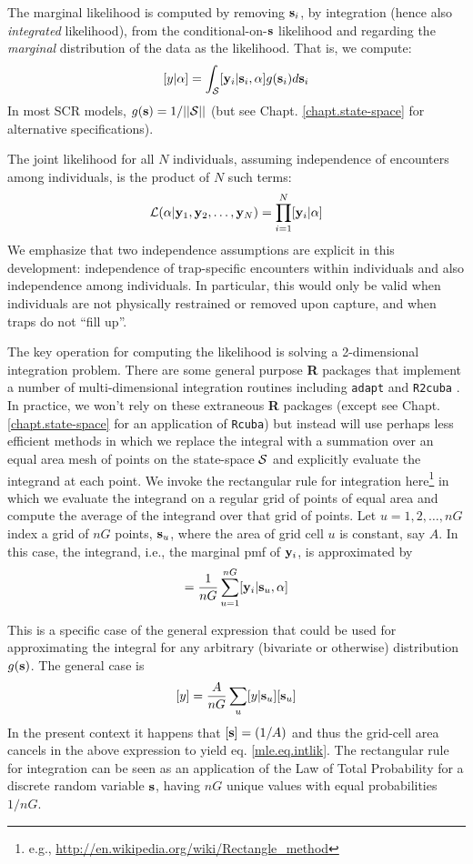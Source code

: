 The marginal likelihood is computed by removing
${\bf s}_{i}$, by integration (hence also {\it integrated} likelihood), from the conditional-on-${\bf s}$
likelihood and regarding the {\it marginal} distribution of the data
as 
the likelihood. That
is, we compute:
\[
  [y|\alpha] = 
\int_{{\cal S}}  [ {\bf y}_{i} |{\bf s}_{i}, \alpha] g({\bf s}_{i}) d{\bf s}_{i}
\]
In most SCR models, $g({\bf s}) = 1/||{\cal S}||$ (but see Chapt. \ref{chapt.state-space} for
alternative specifications).

The joint likelihood for all $N$ individuals, assuming independence of
encounters among individuals, is the product of $N$ such terms:
\[
{\cal L}(\alpha | {\bf y}_{1},{\bf y}_{2},\ldots, {\bf y}_{N}) =     \prod_{i=1}^{N}
[{\bf y}_{i}|\alpha]
\]
We emphasize that two independence assumptions are explicit in this
development: independence of trap-specific encounters within
individuals and also independence among individuals. In particular,
this would only be valid when individuals are not physically
restrained or removed upon capture, and when traps do not ``fill up''.

The key operation for computing the likelihood is solving a
2-dimensional integration problem. There are some general purpose {\bf
  R} packages that implement a number of 
 multi-dimensional integration routines
including \mbox{\tt adapt} \citep{genz_etal:2007} and \mbox{\tt R2cuba}
\citep{hahn_etal:2011}.  In practice, we won't rely
on these extraneous {\bf R} packages (except see
Chapt. \ref{chapt.state-space} for an application of \mbox{\tt Rcuba})
but instead will use perhaps less
efficient methods in which we replace the integral with a summation
over an equal area mesh of points on the state-space ${\cal S}$ and explicitly
evaluate the integrand at each point. We invoke the rectangular rule
for integration here\footnote{e.g., 
\url{http://en.wikipedia.org/wiki/Rectangle_method}
} in which we
evaluate the
integrand on a regular grid of points of equal area and compute the
average of
the integrand over that grid of points. 
Let $u=1,2,\ldots,nG$ index a grid of
$nG$ points, ${\bf s}_{u}$,  where the area of grid cell $u$ is
constant, say $A$.
In this case, the integrand, i.e., the marginal pmf of 
${\bf y}_{i}$, is approximated by  
\begin{equation}
         [{\bf y}_{i}|\alpha] = \frac{1}{nG} \sum_{u=1}^{nG}  [ {\bf
            y}_{i} |{\bf s}_u, \alpha]
\label{mle.eq.intlik}
\end{equation}

This is a specific case of the general expression that could be used
for approximating the integral for any arbitrary (bivariate or otherwise)
distribution $g({\bf s})$. The general case is
\[
[y]  = \frac{A}{nG} \sum_{u} [y|{\bf s}_{u}] [{\bf s}_{u}]
\]
 In the present context it happens that  $[{\bf s}] = (1/A)$
and thus the grid-cell area cancels in the above
expression to yield eq. \ref{mle.eq.intlik}.
The rectangular rule for integration can be seen as an application of
the Law of Total Probability for a discrete random variable ${\bf
  s}$, having $nG$ 
unique values with equal probabilities $1/nG$.



